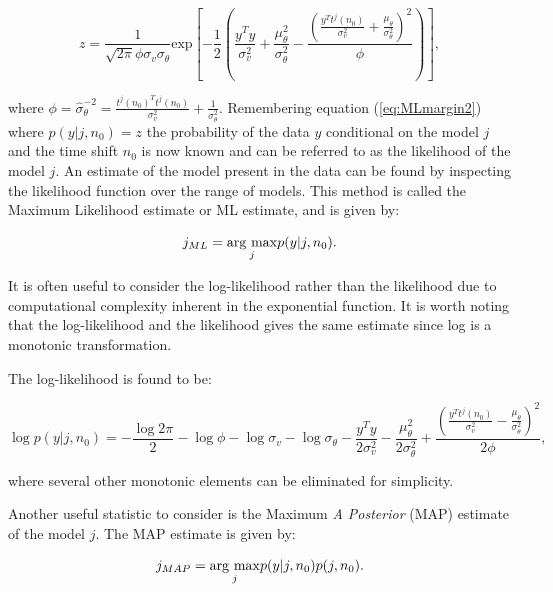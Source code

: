 \begin{equation}\label{eq:MLprod7}
z = \frac{1}{\sqrt{2 \pi}\phi \sigma_v \sigma_\theta}\textrm{exp}\left[-\frac{1}{2}\left(\frac{y^T y}{\sigma^2_v}+\frac{\mu_\theta^2}{\sigma_\theta^2} - \frac{\left(\frac{y^T t^j(n_0)}{\sigma_v^2}+\frac{\mu_\theta}{\sigma_\theta^2}\right)^2}{\phi}\right)\right],
\end{equation}

where $\phi = \hat{\sigma}^{-2}_\theta = \frac{t^j(n_0)^Tt^j(n_0)}{\sigma_v^2} + \frac{1}{\sigma_\theta^2}$. Remembering equation (\ref{eq:MLmargin2}) \linebreak[0]where \linebreak[0]$p(y|j,n_0) = z$ the probability of the data $y$ conditional on the model $j$ and the time shift $n_0$ is now known and can be referred to as the likelihood of the model $j$. An estimate of the model present in the data can be found by inspecting the likelihood function over the range of models. This method is called the Maximum Likelihood estimate or ML estimate, and is given by:

\begin{equation}\label{eq:MLdefinition}
j_{ML} = \underset{j}{\mathrm{arg~max}} p(y|j,n_0).
\end{equation}

It is often useful to consider the log-likelihood rather than the likelihood due to computational complexity inherent in the exponential function. It is worth noting that the log-likelihood and the likelihood gives the same estimate since log is a monotonic transformation.

The log-likelihood is found to be:

\begin{equation}\label{eq:MLloglikelihood}
\log{p(y|j,n_0)} = -\frac{\log{2\pi}}{2} - \log{\phi} - \log{\sigma_v} -\log{\sigma_\theta} - \frac{y^T y}{2\sigma_v^2} -\frac{\mu^2_\theta}{2\sigma^2_\theta} + \frac{\left(\frac{y^T t^j(n_0)}{\sigma^2_v}-\frac{\mu_\theta}{\sigma^2_\theta}\right)^2}{2\phi},
\end{equation}

where several other monotonic elements can be eliminated for simplicity.

Another useful statistic to consider is the Maximum \emph{A Posterior} (MAP) estimate of the model $j$. The MAP estimate is given by:

\begin{equation}\label{eq:MAPdefinition}
j_{MAP} = \underset{j}{\mathrm{arg~max}} p(y|j,n_0)p(j,n_0).
\end{equation}


